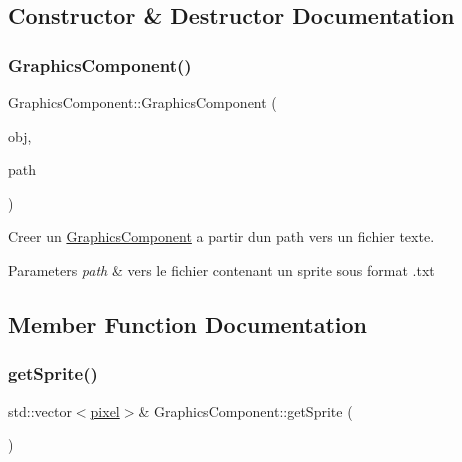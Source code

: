\subsection{Constructor \& Destructor Documentation}
\hypertarget{class_graphics_component_a342ca4852ca1bd06471cd2db0614fdab}{}\label{class_graphics_component_a342ca4852ca1bd06471cd2db0614fdab} 
\subsubsection{\texorpdfstring{Graphics\+Component()}{GraphicsComponent()}}
{\footnotesize\ttfamily Graphics\+Component\+::\+Graphics\+Component (\begin{DoxyParamCaption}\item[{\hyperlink{class_game_object}{Game\+Object} $\ast$}]{obj,  }\item[{std\+::string}]{path }\end{DoxyParamCaption})}



Creer un \hyperlink{class_graphics_component}{Graphics\+Component} a partir d\textquotesingle{}un path vers un fichier texte. 


\begin{DoxyParams}{Parameters}
{\em path} & vers le fichier contenant un sprite sous format .txt \\
\hline
\end{DoxyParams}


\subsection{Member Function Documentation}
\hypertarget{class_graphics_component_aa88d6da1d4cceb7bf2b16c0419312517}{}\label{class_graphics_component_aa88d6da1d4cceb7bf2b16c0419312517} 
\subsubsection{\texorpdfstring{get\+Sprite()}{getSprite()}}
{\footnotesize\ttfamily std\+::vector$<$\hyperlink{structpixel}{pixel}$>$\& Graphics\+Component\+::get\+Sprite (\begin{DoxyParamCaption}{ }\end{DoxyParamCaption})\hspace{0.3cm}{\ttfamily [inline]}}



